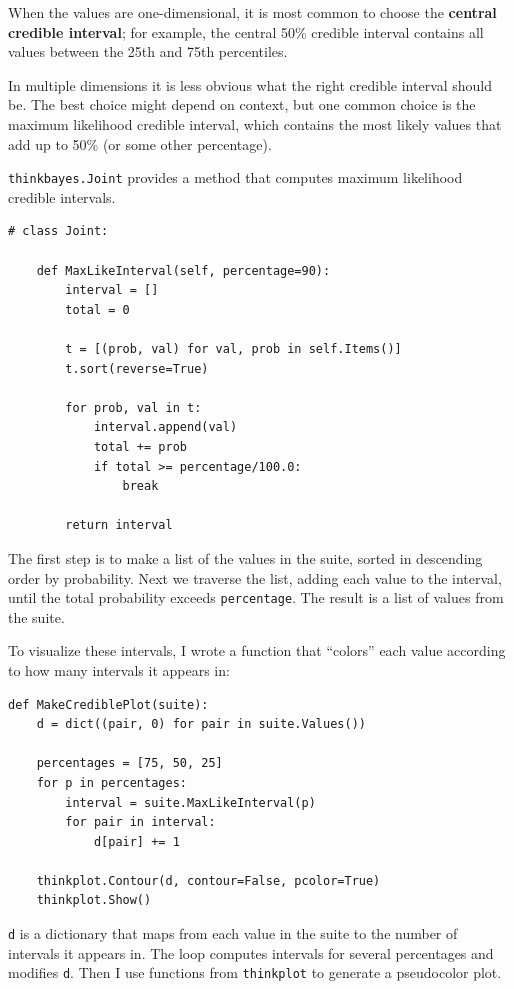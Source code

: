 \documentclass[12pt]{book}
\begin{document}
When the values are one-dimensional, it is most common to choose
the {\bf central credible interval}; for example, the central 50\%
credible interval contains all values between the 25th and 75th
percentiles.

In multiple dimensions it is less obvious what the right credible
interval should be.  The best choice might depend on context, but
one common choice is the maximum likelihood credible interval, which
contains the most likely values that add up to 50\% (or some other
percentage).

{\tt thinkbayes.Joint} provides a method that computes maximum
likelihood credible intervals. 

\begin{verbatim}
# class Joint:

    def MaxLikeInterval(self, percentage=90):
        interval = []
        total = 0

        t = [(prob, val) for val, prob in self.Items()]
        t.sort(reverse=True)

        for prob, val in t:
            interval.append(val)
            total += prob
            if total >= percentage/100.0:
                break

        return interval
\end{verbatim}

The first step is to make a list of the values in the suite,
sorted in descending order by probability.  Next we traverse the
list, adding each value to the interval, until the total
probability exceeds {\tt percentage}.  The result is a list
of values from the suite.

To visualize these intervals, I wrote a function that ``colors''
each value according to how many intervals it appears in:

\begin{verbatim}
def MakeCrediblePlot(suite):
    d = dict((pair, 0) for pair in suite.Values())

    percentages = [75, 50, 25]
    for p in percentages:
        interval = suite.MaxLikeInterval(p)
        for pair in interval:
            d[pair] += 1

    thinkplot.Contour(d, contour=False, pcolor=True)
    thinkplot.Show()
\end{verbatim}

{\tt d} is a dictionary that maps from each value in the suite
to the number of intervals it appears in.  The loop computes intervals
for several percentages and modifies {\tt d}.  Then I use functions
from {\tt thinkplot} to generate a pseudocolor plot.
\end{document}
